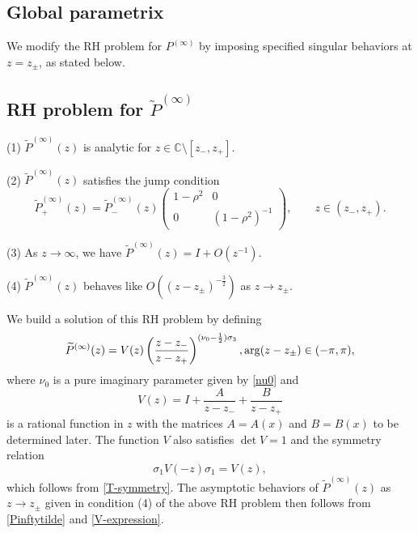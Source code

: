 \documentclass[11pt,a4paper]{article}
\numberwithin{equation}{section}
\def\arg {\mathop{\rm arg}\nolimits}
\begin{document}
\subsection{Global parametrix}
We modify the RH problem for $P^{(\infty)}$ by imposing specified singular behaviors at $z=z_{\pm}$, as stated below.
\subsection*{RH problem for $\widetilde{P}^{(\infty)}$}
\begin{description}
  \item{(1)} $\widetilde{P}^{(\infty)}(z)$ is analytic for $z\in \mathbb{C}\setminus [z_{-},z_{+}]$.
  \item{(2)} $\widetilde{P}^{(\infty)}(z)$ satisfies the jump condition
  \begin{equation}\label{Pinftyjump-m}
  \widetilde{P}^{(\infty)}_{+}(z)=\widetilde{P}^{(\infty)}_{-}(z)
  \begin{pmatrix}1-\rho^2 & 0 \\ 0 & (1-\rho^2)^{-1}\end{pmatrix},\qquad z\in(z_-,z_+).
  \end{equation}
  \item{(3)} As $z\rightarrow \infty$, we have $\widetilde{P}^{(\infty)}(z)=I+O(z^{-1})$.
  \item{(4)} $\widetilde{P}^{(\infty)}(z)$ behaves like $O((z-z_{\pm})^{-\frac{3}{2}})$ as $z \to z_{\pm}$.
\end{description}

We build a solution of this RH problem by defining
\begin{equation}\label{Pinftytilde}
\widetilde{P}^{(\infty)}(z)={V}(z)
\left(\frac{z-z_-}{z-z_+}\right)^{(\nu_0-\frac{1}{2})\sigma_3},
\arg(z-z_\pm)\in(-\pi,\pi),
\end{equation}
where
$\nu_0$ is a pure imaginary parameter given by \eqref{nu0} and
\begin{equation}\label{V-expression}
{V}(z)=I+\frac{A}{z-z_-}+\frac{B}{z-z_+}
\end{equation}
is a rational function in $z$ with the matrices $A=A(x)$ and $B=B(x)$ to be determined later.  The function $V$ also satisfies $\det{V}=1$ and the symmetry relation
 \begin{equation}\label{V-symmetry}
\sigma_1{V}(-z)\sigma_1=V(z),
\end{equation}
which follows from \eqref{T-symmetry}.   The asymptotic behaviors of $\widetilde{P}^{(\infty)}(z)$ as $z \to z_{\pm}$ given in condition (4) of the above RH problem then follows from \eqref{Pinftytilde} and \eqref{V-expression}. 
\end{document}
